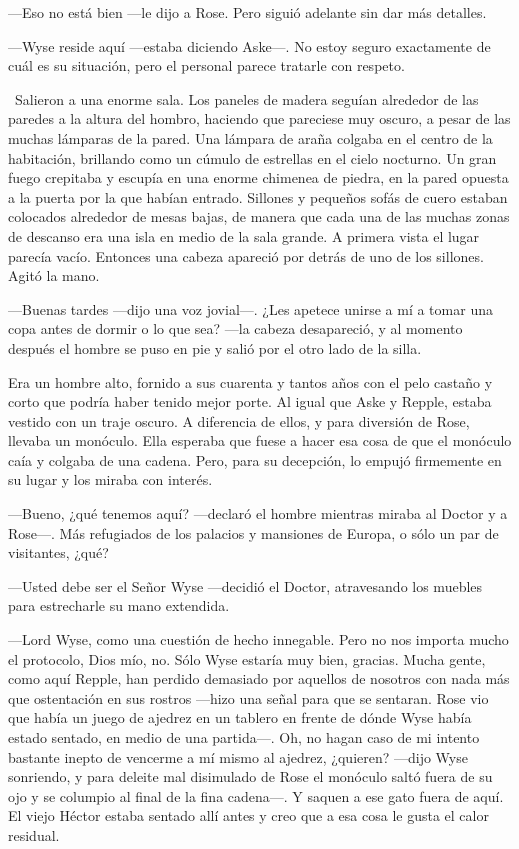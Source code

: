 {---Eso no está bien ---le dijo a Rose. Pero siguió adelante sin dar más
detalles.}

{---Wyse reside aquí ---estaba diciendo Aske---. No estoy seguro
	exactamente de cuál es su situación, pero el personal parece tratarle
con respeto.}

{~Salieron a una enorme sala. Los paneles de madera seguían alrededor de
	las paredes a la altura del hombro, haciendo que pareciese muy oscuro, a
	pesar de las muchas lámparas de la pared. Una lámpara de araña colgaba
	en el centro de la habitación, brillando como un cúmulo de estrellas en
	el cielo nocturno. Un gran fuego crepitaba y escupía en una enorme
	chimenea de piedra, en la pared opuesta a la puerta por la que habían
	entrado. Sillones y pequeños sofás de cuero estaban colocados alrededor
	de mesas bajas, de manera que cada una de las muchas zonas de descanso
	era una isla en medio de la sala grande. A primera vista el lugar
	parecía vacío. Entonces una cabeza apareció por detrás de uno de los
sillones. Agitó la mano.}

{---Buenas tardes ---dijo una voz jovial---. ¿Les apetece unirse a mí a
	tomar una copa antes de dormir o lo que sea? ---la cabeza desapareció, y
	al momento después el hombre se puso en pie y salió por el otro lado de
la silla.}

{Era un hombre alto, fornido a sus cuarenta y tantos años con el pelo
	castaño y corto que podría haber tenido mejor porte. Al igual que Aske y
	Repple, estaba vestido con un traje oscuro. A diferencia de ellos, y
	para diversión de Rose, llevaba un monóculo. Ella esperaba que fuese a
	hacer esa cosa de que el monóculo caía y colgaba de una cadena. Pero,
	para su decepción, lo empujó firmemente en su lugar y los miraba con
interés.}

{---Bueno, ¿qué tenemos aquí? ---declaró el hombre mientras miraba al
	Doctor y a Rose---. Más refugiados de los palacios y mansiones de
Europa, o sólo un par de visitantes, ¿qué?}

{---Usted debe ser el Señor Wyse ---decidió el Doctor, atravesando los
muebles para estrecharle su mano extendida.}

{---Lord Wyse, como una cuestión de hecho innegable. Pero no nos importa
	mucho el protocolo, Dios mío, no. Sólo Wyse estaría muy bien, gracias.
	Mucha gente, como aquí Repple, han perdido demasiado por aquellos de
	nosotros con nada más que ostentación en sus rostros ---hizo una señal
	para que se sentaran. Rose vio que había un juego de ajedrez en un
	tablero en frente de dónde Wyse había estado sentado, en medio de una
	partida---. Oh, no hagan caso de mi intento bastante inepto de vencerme
	a mí mismo al ajedrez, ¿quieren? ---dijo Wyse sonriendo, y para deleite
	mal disimulado de Rose el monóculo saltó fuera de su ojo y se columpio
	al final de la fina cadena---. Y saquen a ese gato fuera de aquí. El
	viejo Héctor estaba sentado allí antes y creo que a esa cosa le gusta el
calor residual.}

